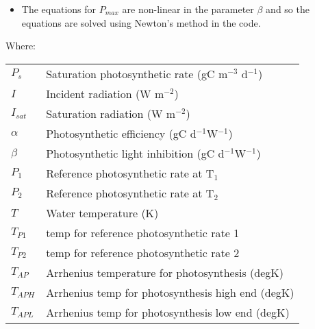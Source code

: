 \documentclass{deltares_manual}
\begin{document}
\begin{itemize}
\item The equations for $P_{max}$ are non-linear in the parameter $\beta$ and so the equations are solved using Newton's method in the code.
\end{itemize}

Where:\\
\begin{tabular}{ll}
$P_s$ & Saturation photosynthetic rate (gC m$^{-3}$ d$^{-1}$)\\
$I$ & Incident radiation (W m$^{-2}$)\\
$I_{sat}$ & Saturation radiation (W m$^{-2}$)\\
$\alpha$ & Photosynthetic efficiency (gC d$^{-1}$W$^{-1}$) \\
$\beta$ & Photosynthetic light inhibition (gC d$^{-1}$W$^{-1}$) \\
$P_1$ & Reference photosynthetic rate at T$_1$\\
$P_2$ & Reference photosynthetic rate at T$_2$\\
$T$ & Water temperature (K)\\
$T_{P1}$ & temp for reference photosynthetic rate 1\\
$T_{P2}$ & temp for reference photosynthetic rate 2	\\
$T_{AP}$ & Arrhenius temperature for photosynthesis               (degK)\\
$T_{APH}$ & Arrhenius temp for photosynthesis high end             (degK)\\
$T_{APL}$ & Arrhenius temp for photosynthesis low end             (degK)\\
\end{tabular}
\end{document}

